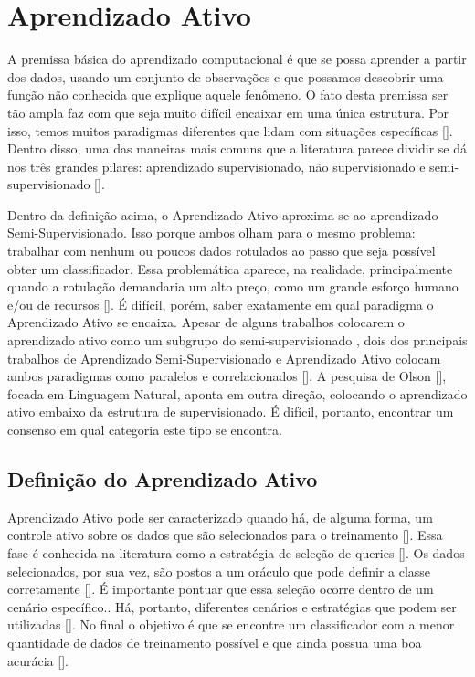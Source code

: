 \chapter{Aprendizado Ativo}
\label{cap:aprendizado_ativo}

A premissa básica do aprendizado computacional é que se possa aprender a partir dos dados, usando um conjunto de observações e que possamos descobrir uma função não conhecida que explique aquele fenômeno. O fato desta premissa ser tão ampla faz com que seja muito difícil encaixar em uma única estrutura. Por isso, temos muitos paradigmas diferentes que lidam com situações específicas [\cite{abu2012learning}]. Dentro disso, uma das maneiras mais comuns que a literatura parece dividir se dá nos três grandes pilares: aprendizado supervisionado, não supervisionado e semi-supervisionado [\cite{abu2012learning}]. 

Dentro da definição acima, o Aprendizado Ativo aproxima-se ao aprendizado Semi-Supervisionado. Isso porque ambos olham para o mesmo problema: trabalhar com nenhum ou poucos dados rotulados ao passo que seja possível obter um classificador. Essa problemática aparece, na realidade, principalmente quando a rotulação demandaria um alto preço, como um grande esforço humano e/ou de recursos [\cite{settles2012active}]. É difícil, porém, saber exatamente em qual paradigma o Aprendizado Ativo se encaixa. Apesar de alguns trabalhos colocarem o aprendizado ativo como um subgrupo do semi-supervisionado , dois dos principais trabalhos de Aprendizado Semi-Supervisionado e Aprendizado Ativo colocam ambos paradigmas como paralelos e correlacionados [\cite{settles2012active, zhu2006semi}]. A pesquisa de Olson [\cite{olsson2009literature}], focada em Linguagem Natural, aponta em outra direção, colocando o aprendizado ativo embaixo da estrutura de supervisionado. É difícil, portanto, encontrar um consenso em qual categoria este tipo se encontra.


\section{Definição do Aprendizado Ativo}
\label{sec:definicao}

Aprendizado Ativo pode ser caracterizado quando há, de alguma forma, um controle ativo sobre os dados que são selecionados para o treinamento [\cite{cohn1994improving}]. Essa fase é conhecida na literatura como a estratégia de seleção de queries [\cite{settles2014active}]. Os dados selecionados, por sua vez, são postos a um oráculo que pode definir a classe corretamente [\cite{olsson2009literature}]. É importante pontuar que essa seleção ocorre dentro de um cenário específico.. Há, portanto, diferentes cenários e estratégias que podem ser utilizadas [\cite{settles2014active}]. No final o objetivo é que se encontre um classificador com a menor quantidade de dados de treinamento possível e que ainda possua uma boa acurácia [\cite{dasgupta2011two}].

